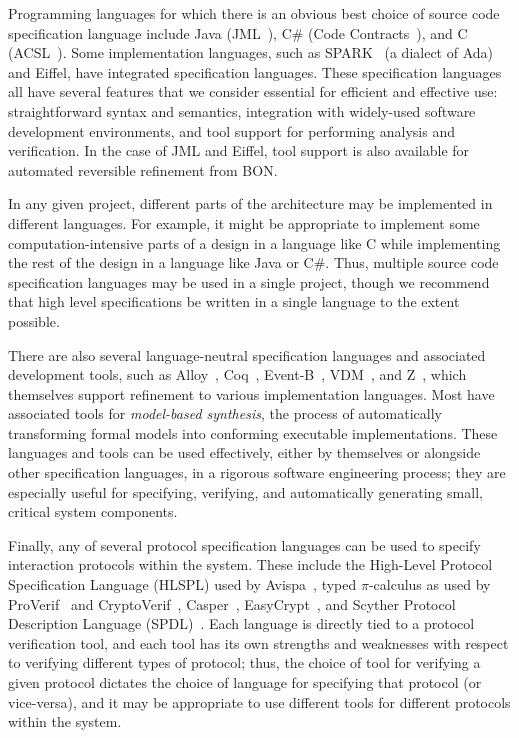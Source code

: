 Programming languages for which there is an obvious best choice of
source code specification language include Java
(JML~\cite{JMLReferenceManual}), C\# (Code
Contracts~\cite{CodeContracts}), and C (ACSL~\cite{ACSL}). Some
implementation languages, such as SPARK~\cite{SPARK2014} (a dialect of
Ada) and Eiffel, have integrated specification languages. These
specification languages all have several features that we consider
essential for efficient and effective use: straightforward syntax and
semantics, integration with widely-used software development
environments, and tool support for performing analysis and
verification. In the case of JML and Eiffel, tool support is also
available for automated reversible refinement from BON.

In any given project, different parts of the architecture may be
implemented in different languages. For example, it might be
appropriate to implement some computation-intensive parts of a design
in a language like C while implementing the rest of the design in a
language like Java or C\#. Thus, multiple source code specification
languages may be used in a single project, though we recommend that
high level specifications be written in a single language to the
extent possible.

There are also several language-neutral specification languages and
associated development tools, such as Alloy~\cite{Alloy},
Coq~\cite{Coq}, Event-B~\cite{Abrial10}, VDM~\cite{VDM}, and
Z~\cite{Zed}, which themselves support refinement to various
implementation languages. Most have associated tools for
\emph{model-based synthesis}, the process of automatically
transforming formal models into conforming executable
implementations. These languages and tools can be used effectively,
either by themselves or alongside other specification languages, in a
rigorous software engineering process; they are especially useful for
specifying, verifying, and automatically generating small, critical
system components.

Finally, any of several protocol specification languages can be used
to specify interaction protocols within the system. These include
the High-Level Protocol Specification Language (HLSPL) used by
Avispa~\cite{Avispa}, typed $\pi$-calculus as used by
ProVerif~\cite{ProVerif} and CryptoVerif~\cite{CryptoVerif},
Casper~\cite{Casper}, EasyCrypt~\cite{EasyCrypt}, and Scyther Protocol
Description Language (SPDL)~\cite{Scyther}. Each language is directly
tied to a protocol verification tool, and each tool has its own
strengths and weaknesses with respect to verifying different types of
protocol; thus, the choice of tool for verifying a given protocol
dictates the choice of language for specifying that protocol (or
vice-versa), and it may be appropriate to use different tools for
different protocols within the system.

